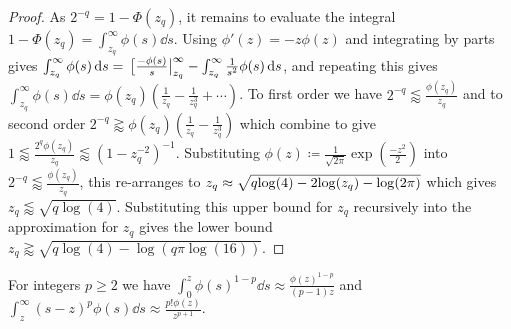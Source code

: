 \documentclass[manuscript,review]{acmart}
\begin{document}
\begin{proof}
As $ 2^{-q} = 1 - \Phi(z_q) $, it remains to evaluate the integral $ 1 - \Phi(z_q) = \int_{z_q}^{\infty} \phi(s) \dd{s} $. Using $ \phi'(z) =  -z \phi(z) $ and integrating by parts gives $ \int_{z_q}^{\infty} \phi(s) \dd{s} = \eval*[\tfrac{-\phi(s)}{s}|_{z_q}^{\infty} - \int_{z_q}^{\infty} \tfrac{1}{s^2} \phi(s) \dd{s} $, and repeating this gives $ \int_{z_q}^{\infty} \phi(s) \dd{s}  = \phi(z_q)(\tfrac{1}{z_q} - \tfrac{1}{z_q^3} + \cdots) $. To first order we have $ 2^{-q} \lessapprox \tfrac{\phi(z_q)}{z_q} $ and to second order $ 2^{-q} \gtrapprox \phi(z_q)(\tfrac{1}{z_q} - \tfrac{1}{z_q^3}) $ which combine to give $ 1 \lessapprox \tfrac{2^q\phi(z_q)}{z_q} \lessapprox (1 - z_q^{-2})^{-1}$.  Substituting $ \phi(z) \coloneqq \tfrac{1}{\sqrt{2 \pi}} {\exp}(\tfrac{-z^2}{2}) $ into $ 2^{-q} \lessapprox \tfrac{\phi(z_q)}{z_q} $, this re-arranges to $ z_q \approx \sqrt{q{\log}(4) - 2{\log}(\smash{z_q}) - {\log}(2\pi)} $ which gives $ z_q \lessapprox \sqrt{q \log(4)} $. Substituting this upper bound for $ z_q $ recursively into the approximation  for $ z_q $ gives the lower bound $ z_q \gtrapprox  \sqrt{q \log(4) - \log(q \pi \log(16))}$. \qedhere
\end{proof}

\begin{lemma}
\label{lemma:approximate_moments}
For integers $ p \geq 2 $ we have $ \int_{0}^{z} \phi(s)^{1-p} \dd{s} \approx \tfrac{\phi(z)^{1-p}}{(p-1)z}  $ and $ \int_{z}^{\infty} (s-z)^p\phi(s) \dd{s} \approx \tfrac{p!\phi(z)}{z^{p+1}} $.
\end{lemma}
\end{document}
